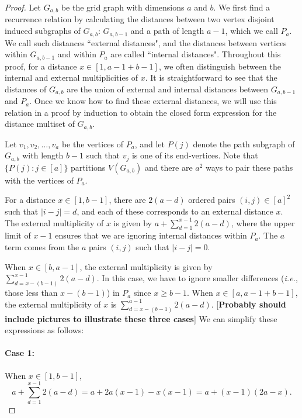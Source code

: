 \documentclass[12]{article}
\theoremstyle{definition}
\begin{document}
\begin{proof}
	
	
	
	Let $G_{a,b}$ be the grid graph with dimensions $a$ and $b$.  We first find a recurrence relation by calculating the distances between two vertex disjoint induced subgraphs of $G_{a,b}$: $G_{a,b-1}$ and a path of length $a-1$, which we call $P_a$.  We call such distances ``external distances", and the distances between vertices within $G_{a,b-1}$ and within $P_{a}$ are called ``internal distances".  Throughout this proof, for a distance $x \in [1, a-1+b-1]$, we often distinguish between the internal and external multiplicities of $x$.  It is straightforward to see that the distances of $G_{a,b}$ are the union of external and internal distances between $G_{a,b-1}$ and $P_a$.  Once we know how to find these external distances, we will use this relation in a proof by induction to obtain the closed form expression for the distance multiset of $G_{a,b}$.  
	
	Let $v_1, v_2, \ldots, v_a$ be the vertices of $P_a$, and let $P(j)$ denote the path subgraph of $G_{a,b}$ with length $b-1$ such that $v_j$ is one of its end-vertices.  Note that $\{P(j):j \in [a]\}$ partitions $V(G_{a,b})$ and there are $a^2$ ways to pair these paths with the vertices of $P_a$.  
	
	For a distance $x \in [1,b-1]$, there are $2(a-d)$ ordered pairs $(i,j) \in [a]^2$ such that $|i-j| = d$, and each of these corresponds to an external distance $x$.  The external multiplicity of $x$ is given by $a + \sum_{d=1}^{x-1}2(a-d)$, where the upper limit of $x-1$ ensures that we are ignoring internal distances within $P_a$.  The $a$ term comes from the $a$ pairs $(i,j)$ such that $|i-j| = 0$.  
	
	When $x \in [b,a-1]$, the external multiplicity is given by $\sum_{d=x-(b-1)}^{x-1}2(a-d)$.  In this case, we have to ignore smaller differences (\textit{i.e.}, those less than $x-(b-1)$) in $P_a$ since $x \geq b-1$.  When $x \in [a,a-1+b-1]$, the external multiplicity of $x$ is $\sum_{d=x-(b-1)}^{a-1}2(a-d)$. [\textbf{Probably should include pictures to illustrate these three cases}]  We can simplify these expressions as follows:
	

\paragraph{Case 1:}When $x \in [1,b-1]$, 
			$$a + \sum_{d=1}^{x-1}2(a-d) = a + 2a(x-1) - x(x-1) 
			= a+(x-1)(2a-x).$$

\end{proof}
\end{document}
